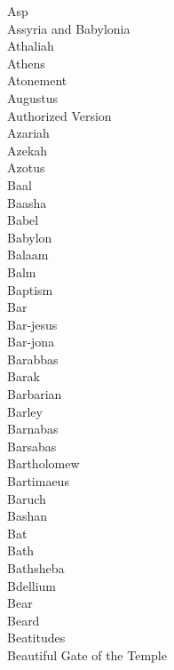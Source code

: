 Asp  \\
Assyria and Babylonia  \\
Athaliah  \\
Athens  \\
Atonement  \\
Augustus  \\
Authorized Version  \\
Azariah  \\
Azekah  \\
Azotus  \\
Baal  \\
Baasha  \\
Babel  \\
Babylon  \\
Balaam  \\
Balm  \\
Baptism  \\
Bar  \\
Bar-jesus  \\
Bar-jona  \\
Barabbas  \\
Barak  \\
Barbarian  \\
Barley  \\
Barnabas  \\
Barsabas  \\
Bartholomew  \\
Bartimaeus  \\
Baruch  \\
Bashan  \\
Bat  \\
Bath  \\
Bathsheba  \\
Bdellium  \\
Bear  \\
Beard  \\
Beatitudes  \\
Beautiful Gate of the Temple  \\

